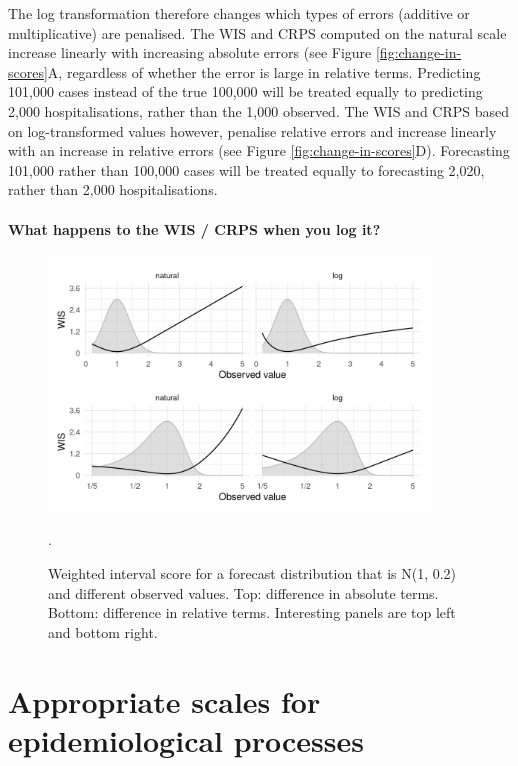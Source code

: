 \documentclass{article}
\begin{document}
The log transformation therefore changes which types of errors (additive or multiplicative) are penalised. The WIS and CRPS computed on the natural scale increase linearly with increasing absolute errors (see Figure \ref{fig:change-in-scores}A, regardless of whether the error is large in relative terms. Predicting 101,000 cases instead of the true 100,000 will be treated equally to predicting 2,000 hospitalisations, rather than the 1,000 observed. The WIS and CRPS based on log-transformed values however, penalise relative errors and increase linearly with an increase in relative errors (see Figure \ref{fig:change-in-scores}D). Forecasting 101,000 rather than 100,000 cases will be treated equally to forecasting 2,020, rather than 2,000 hospitalisations. 

\paragraph{What happens to the WIS / CRPS when you log it?}
\begin{figure}[h!]
    \centering
    \includegraphics[width=0.9\textwidth]{output/figures/SIM-effect-log-score.png}
    \caption{Weighted interval score for a forecast distribution that is N(1, 0.2) and different observed values. Top: difference in absolute terms. Bottom: difference in relative terms. Interesting panels are top left and bottom right.}. 
    \label{fig:log-crps-viz}
\end{figure}




\section{Appropriate scales for epidemiological processes}
\end{document}
